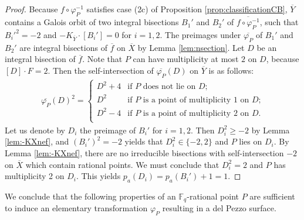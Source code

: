 \documentclass[a4paper, 11pt, reqno]{amsart}
\numberwithin{equation}{section} \numberwithin{figure}{section}
\def \F {{\mathbb F}}
\theoremstyle{definition}
\numberwithin{lemma}{section}
\begin{document}
\begin{proof}
    Because $f \circ \varphi_{\scriptscriptstyle P}^{-1}$ satisfies case (2c) of Proposition \ref{prop:classificationCB}, $\overline{Y}$ contains a Galois orbit of two integral bisections $B_1'$ and $B_2'$ of $\overline{f \circ \varphi_{\scriptscriptstyle P}^{-1}}$, such that $B_i'^2 = -2$ and $-K_{\overline{Y}} \cdot [B_i'] = 0$ for $i = 1, 2$. The preimages under $\overline{\varphi_{\scriptscriptstyle P}}$ of $B_1'$ and $B_2'$ are integral bisections of $\overline{f}$ on $\overline{X}$ by Lemma \ref{lem:nsection}. Let $D$ be an integral bisection of $\overline{f}$. Note that $P$ can have multiplicity at most $2$ on $D$, because $[D] \cdot F = 2$. Then the self-intersection of $\overline{\varphi_{\scriptscriptstyle P}}(D)$ on $\overline{Y}$ is as follows:
    \begin{align*}
        \overline{\varphi_{\scriptscriptstyle P}}(D)^2 = \begin{cases}
             D^2 + 4 &\text{if $P$ does not lie on $D$;}\\
             D^2 &\text{if $P$ is a point of multiplicity $1$ on $D$;}\\
             D^2 - 4 &\text{if $P$ is a point of multiplicity $2$ on $D$.}\\ 
        \end{cases}
    \end{align*}
Let us denote by $D_i$ the preimage of $B_i'$ for $i = 1, 2$. Then $D_i^2 \geq -2$ by Lemma \ref{lem:-KXnef}, and $(B_i')^2 = -2$ yields that $D_i^2 \in \{-2, 2\}$ and $P$ lies on $D_i$. By Lemma \ref{lem:-KXnef}, there are no irreducible bisections with self-intersection $-2$ on $\overline{X}$ which contain rational points. We must conclude that $D_i^2 = 2$ and $P$ has multiplicity 2 on $D_i$. This yields $p_a(D_i) = p_a(B_i') + 1 = 1$.
\end{proof}

We conclude that the following properties of an $\F_q$-rational point $P$ are sufficient to induce an elementary transformation $\varphi_{\scriptscriptstyle P}$ resulting in a del Pezzo surface.
\end{document}
